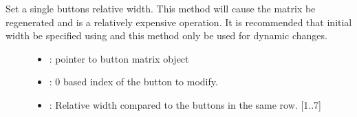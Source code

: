 \documentclass[letterpaper,10pt,english]{sphinxmanual}
\begin{document}
\begin{fulllineitems}
\label{\detokenize{object-types/btnm:_CPPv421lv_btnm_set_btn_widthPK8lv_obj_t8uint16_t7uint8_t}}%
\pysigstartmultiline
{}\label{\detokenize{object-types/btnm:lv__btnm_8h_1a72abdc1b01e584bad5fa9edf80a0ecff}}%
\pysigstopmultiline
Set a single buttons relative width. This method will cause the matrix be regenerated and is a relatively expensive operation. It is recommended that initial width be specified using  and this method only be used for dynamic changes. \begin{description}
\item[{}] \leavevmode\begin{itemize}
\item {} 
: pointer to button matrix object 

\item {} 
: 0 based index of the button to modify. 

\item {} 
: Relative width compared to the buttons in the same row. {[}1..7{]} 

\end{itemize}

\end{description}


\end{fulllineitems}

\end{document}
